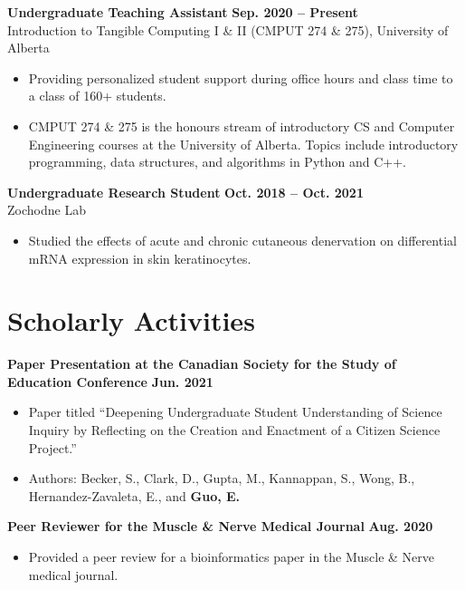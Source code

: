 \documentclass{article}
\begin{document}
\textbf{Undergraduate Teaching Assistant} \hfill \textbf{Sep. 2020 -- Present}\\
Introduction to Tangible Computing I \& II (CMPUT 274 \& 275), University of Alberta
\begin{itemize}
    \item Providing personalized student support during office hours and class time to a class of 160+ students.
    \item CMPUT 274 \& 275 is the honours stream of introductory CS and Computer Engineering courses at the University of Alberta. Topics include introductory programming, data structures, and algorithms in Python and C++.
\end{itemize}

\textbf{Undergraduate Research Student} \hfill \textbf{Oct. 2018 -- Oct. 2021}\\
Zochodne Lab
\begin{itemize}
    \item Studied the effects of acute and chronic cutaneous denervation on differential mRNA expression in skin keratinocytes.
\end{itemize}


\section*{\textcolor{my_colour}{Scholarly Activities}}
\vspace{-.25em} \hrulefill \vspace{.75em}

\textbf{Paper Presentation at the Canadian Society for the Study of Education Conference} \hfill \textbf{Jun. 2021}
\begin{itemize}
    \item Paper titled ``Deepening Undergraduate Student Understanding of Science Inquiry by Reflecting on the Creation and Enactment of a Citizen Science Project.''
    \item Authors: Becker, S., Clark, D., Gupta, M., Kannappan, S., Wong, B., Hernandez-Zavaleta, E., and \textbf{Guo, E.}
\end{itemize}

\textbf{Peer Reviewer for the Muscle \& Nerve Medical Journal} \hfill \textbf{Aug. 2020}
\begin{itemize}
    \item Provided a peer review for a bioinformatics paper in the Muscle \& Nerve medical journal.
\end{itemize}
\end{document}
